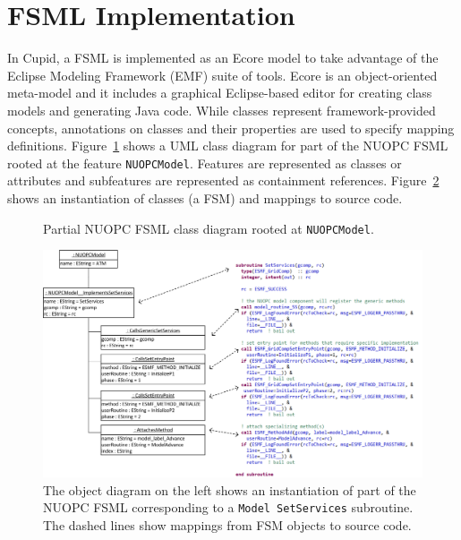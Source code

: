 \documentclass[oneside,11pt]{memoir}
\begin{document}
\section{FSML Implementation}

In Cupid, a FSML is implemented as an Ecore model to take advantage of the Eclipse Modeling Framework (EMF) suite of tools. Ecore is an object-oriented meta-model and it includes a graphical Eclipse-based editor for creating class models and generating Java code. While classes represent framework-provided concepts, annotations on classes and their properties are used to specify mapping definitions. Figure~\ref{fig:nuopcmodel} shows a UML class diagram for part of the NUOPC FSML rooted at the feature \texttt{NUOPCModel}. Features are represented as classes or attributes and subfeatures are represented as containment references. Figure~\ref{fig:setservices_mappings} shows an instantiation of classes (a FSM) and mappings to source code.

\begin{figure}
	\centering
	 \caption{Partial NUOPC FSML class diagram rooted at \texttt{NUOPCModel}.}
	\label{fig:nuopcmodel}
\end{figure}

\begin{figure}
	\centering
	 \includegraphics[width=1.1\textwidth]{figs/setservices_mappings.png}
	\caption{The object diagram on the left shows an instantiation of part of the NUOPC FSML corresponding to a \texttt{Model SetServices} subroutine. The dashed lines show mappings from FSM objects to source code.}
	\label{fig:setservices_mappings}
\end{figure}








\end{document}
